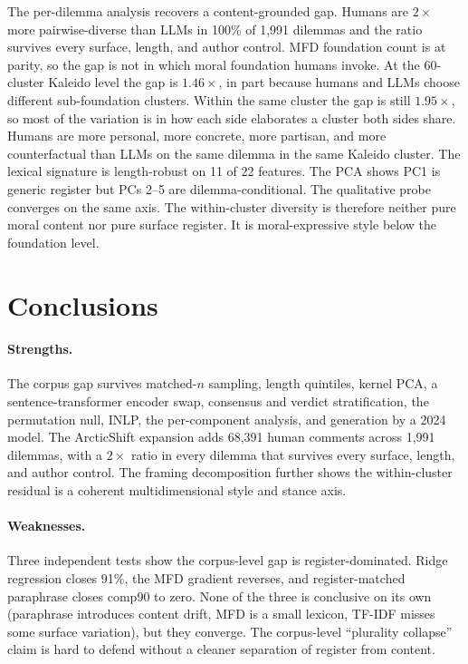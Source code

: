 \documentclass[11pt,a4paper]{article}
\begin{document}
The per-dilemma analysis recovers a content-grounded gap. Humans are $2\times$ more pairwise-diverse than LLMs in 100\% of 1,991 dilemmas and the ratio survives every surface, length, and author control. MFD foundation count is at parity, so the gap is not in which moral foundation humans invoke. At the 60-cluster Kaleido level the gap is $1.46\times$, in part because humans and LLMs choose different sub-foundation clusters. Within the same cluster the gap is still $1.95\times$, so most of the variation is in how each side elaborates a cluster both sides share. Humans are more personal, more concrete, more partisan, and more counterfactual than LLMs on the same dilemma in the same Kaleido cluster. The lexical signature is length-robust on 11 of 22 features. The PCA shows PC1 is generic register but PCs 2--5 are dilemma-conditional. The qualitative probe converges on the same axis. The within-cluster diversity is therefore neither pure moral content nor pure surface register. It is moral-expressive style below the foundation level.

\section{Conclusions}

\paragraph{Strengths.} The corpus gap survives matched-$n$ sampling, length quintiles, kernel PCA, a sentence-transformer encoder swap, consensus and verdict stratification, the permutation null, INLP, the per-component analysis, and generation by a 2024 model. The ArcticShift expansion adds 68,391 human comments across 1,991 dilemmas, with a $2\times$ ratio in every dilemma that survives every surface, length, and author control. The framing decomposition further shows the within-cluster residual is a coherent multidimensional style and stance axis.

\paragraph{Weaknesses.} Three independent tests show the corpus-level gap is register-dominated. Ridge regression closes 91\%, the MFD gradient reverses, and register-matched paraphrase closes comp90 to zero. None of the three is conclusive on its own (paraphrase introduces content drift, MFD is a small lexicon, TF-IDF misses some surface variation), but they converge. The corpus-level ``plurality collapse'' claim is hard to defend without a cleaner separation of register from content.
\end{document}

